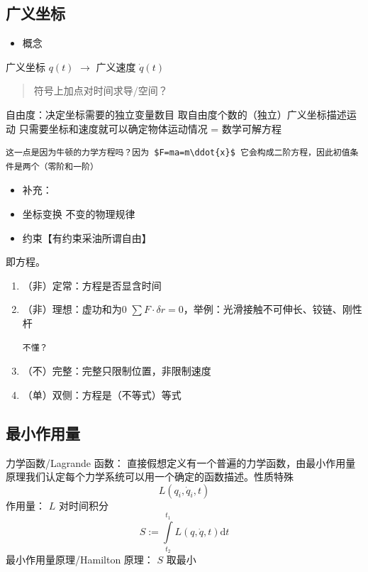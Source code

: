 \documentclass[11pt]{article}
\begin{document}
\subsection{广义坐标}
\label{sec:org20ffa7e}
\begin{itemize}
\item 概念
\end{itemize}

广义坐标 \(q(t)\) \(\rightarrow\) 广义速度 \(\dot{q}(t)\)


\begin{verse}
符号上加点对时间求导/空间？\\[0pt]
\end{verse}

自由度：决定坐标需要的独立变量数目
取自由度个数的（独立）广义坐标描述运动
只需要坐标和速度就可以确定物体运动情况 = 数学可解方程
\begin{verbatim}
这一点是因为牛顿的力学方程吗？因为 $F=ma=m\ddot{x}$ 它会构成二阶方程，因此初值条件是两个（零阶和一阶）
\end{verbatim}

\begin{itemize}
\item 补充：
\item 坐标变换
不变的物理规律
\item 约束【有约束采油所谓自由】
\end{itemize}
即方程。
\begin{enumerate}
\item （非）定常：方程是否显含时间
\item （非）理想：虚功和为0 \(\sum F\cdot\delta r =0\)，举例：光滑接触不可伸长、铰链、刚性杆
\begin{verbatim}
不懂？
\end{verbatim}
\item （不）完整：完整只限制位置，非限制速度
\item （单）双侧：方程是（不等式）等式
\end{enumerate}
\subsection{最小作用量}
\label{sec:org16815e7}
力学函数/Lagrande 函数： 直接假想定义有一个普遍的力学函数，由最小作用量原理我们认定每个力学系统可以用一个确定的函数描述。性质特殊
\begin{equation}
\label{eq:defL}
L(q_i,\dot{q}_i,t)
\end{equation}
作用量： \(L\) 对时间积分
\begin{equation}
\label{eq:defS}
S := \int\limits_{t_2}^{t_1}L(q,\dot{q},t)\mathrm{d}t
\end{equation}
最小作用量原理/Hamilton 原理：
\(S\) 取最小
\end{document}
